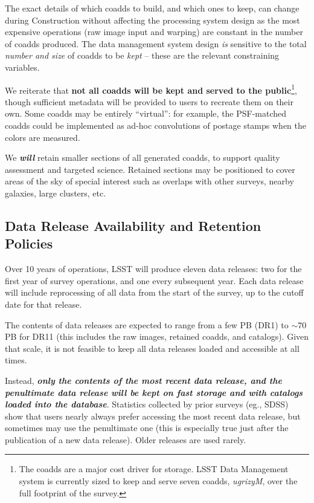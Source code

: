 \documentclass[SE,lsstdraft,toc]{lsstdoc}
\newcommand{\marginreq}[1]{\marginpar{\hspace{0pt}\tiny #1}}
\newcommand{\dmreq}[1]{\marginreq{DMS-REQ-#1}}
\begin{document}
The exact details of which coadds to build, and which ones to keep, can change during Construction without affecting the processing system design as the most expensive operations (raw image input and warping) are constant in the number of coadds produced. The data management system design \emph{is} sensitive to the total \emph{number and size} of coadds to be \emph{kept} -- these are the relevant constraining variables.

We reiterate that \textbf{not all coadds will be kept and served to the public}\footnote{The coadds are a major cost driver for storage. LSST Data Management system is currently sized to keep and serve seven coadds, \emph{ugrizyM}, over the full footprint of the survey.}, though sufficient metadata will be provided to users to recreate them on their own. Some coadds may be entirely ``virtual'': for example, the PSF-matched coadds could be implemented as ad-hoc convolutions of postage stamps when the colors are measured.\dmreq{0311}

We \emph\textbf{will} retain smaller sections of all generated coadds, to support quality assessment and targeted science.\dmreq{0338} Retained sections may be positioned to cover areas of the sky of special interest such as overlaps with other surveys, nearby galaxies, large clusters, etc.

\subsection{Data Release Availability and Retention Policies}
\label{sec:retention}

Over 10 years of operations, LSST will produce eleven data releases: two for the first year of survey operations, and one every subsequent year. Each data release will include reprocessing of all data from the start of the survey, up to the cutoff date for that release.

The contents of data releases are expected to range from a few PB (DR1) to $\sim 70$ PB for DR11 (this includes the raw images, retained coadds, and catalogs). Given that scale, it is not feasible to keep all data releases loaded and accessible at all times.

Instead, \textbf{\emph{only the contents of the most recent data release, and the penultimate data release will be kept on fast storage and with catalogs loaded into the database}}. \dmreq{0313} Statistics collected by prior surveys (eg., SDSS) show that users nearly always prefer accessing the most recent data release, but sometimes may use the penultimate one (this is especially true just after the publication of a new data release). Older releases are used rarely.
\end{document}
